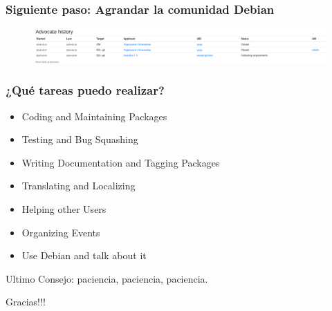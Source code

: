 \documentclass{beamer}
\begin{document}
\begin{frame}
  \frametitle {Siguiente paso: Agrandar la comunidad Debian}
      \begin{figure}
		\centering
		\includegraphics[width=0.7\linewidth]{images/advocate}
		\label{fig:dd}
	\end{figure}
\end{frame}

\begin{frame}
  \frametitle {¿Qué tareas puedo realizar?}
  \begin{itemize}
    \item Coding and Maintaining Packages \pause
    \item Testing and Bug Squashing \pause
    \item Writing Documentation and Tagging Packages \pause
    \item Translating and Localizing \pause
    \item Helping other Users \pause
    \item Organizing Events \pause
    \item Use Debian and talk about it
  \end{itemize}
\end{frame}

\begin{frame}
  \centering
  \huge Ultimo Consejo: paciencia, paciencia, paciencia.
\end{frame}

\begin{frame}
  \centering
  \Huge Gracias!!!
\end{frame}
\end{document}

